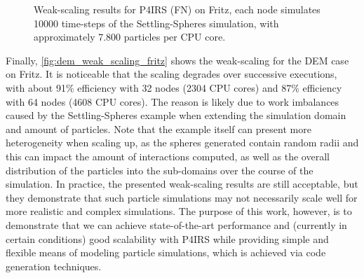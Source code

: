\documentclass[preprint,12pt]{elsarticle}
\begin{document}
\begin{figure}[t]
\centering
{}
\vspace{-3ex}
\caption{Weak-scaling results for P4IRS (FN) on Fritz, each node simulates 10000 time-steps of the Settling-Spheres simulation, with approximately 7.800 particles per CPU core.}
\vspace{-2ex}
\label{fig:dem_weak_scaling_fritz}
\end{figure}

Finally, \autoref{fig:dem_weak_scaling_fritz} shows the weak-scaling for the DEM case on Fritz.
It is noticeable that the scaling degrades over successive executions, with about 91\% efficiency with 32 nodes (2304 CPU cores) and 87\% efficiency with 64 nodes (4608 CPU cores).
The reason is likely due to work imbalances caused by the Settling-Spheres example when extending the simulation domain and amount of particles.
Note that the example itself can present more heterogeneity when scaling up, as the spheres generated contain random radii and this can impact the amount of interactions computed, as well as the overall distribution of the particles into the sub-domains over the course of the simulation.
In practice, the presented weak-scaling results are still acceptable, but they demonstrate that such particle simulations may not necessarily scale well for more realistic and complex simulations.
The purpose of this work, however, is to demonstrate that we can achieve state-of-the-art performance and (currently in certain conditions) good scalability with P4IRS while providing simple and flexible means of modeling particle simulations, which is achieved via code generation techniques.
\end{document}
